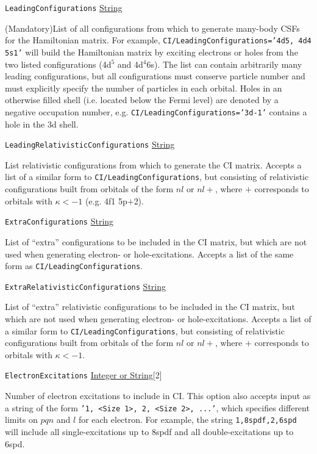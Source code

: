 \documentclass{report}
\begin{document}
\texttt{LeadingConfigurations} \uline{String}
\begin{adjustwidth}{1cm}{}
(Mandatory)List of all configurations from which to generate many-body CSFs for the 
Hamiltonian matrix. For example, \texttt{CI/LeadingConfigurations='4d5, 4d4 5s1'} will build the 
Hamiltonian matrix by exciting electrons or holes from the two listed configurations (4d$^5$ and 
4d$^4$6s). The list can contain arbitrarily many leading configurations, but all configurations must 
conserve particle number and must explicitly specify the number of particles in each orbital. Holes in 
an otherwise filled shell (i.e. located below the Fermi level) are denoted by a negative occupation 
number, e.g. \texttt{CI/LeadingConfigurations='3d-1'} contains a hole in the 3d shell.
\end{adjustwidth}

\texttt{LeadingRelativisticConfigurations} \uline{String}
\begin{adjustwidth}{1cm}{}
List relativistic configurations from which to generate the CI matrix. Accepts a list of a similar form 
to \texttt{CI/LeadingConfigurations}, but consisting of relativistic configurations built from orbitals 
of the form $nl$ or $nl+$, where $+$ corresponds to orbitals with $\kappa < -1$ (e.g. 4f1 5p$+$2).
\end{adjustwidth}


\texttt{ExtraConfigurations} \uline{String}
\begin{adjustwidth}{1cm}{}
List of ``extra'' configurations to be included in the CI matrix, but which are not used when generating
electron- or hole-excitations. Accepts a list of the same form as \texttt{CI/LeadingConfigurations}.
\end{adjustwidth}

\texttt{ExtraRelativisticConfigurations} \uline{String}
\begin{adjustwidth}{1cm}{}
List of ``extra'' relativistic configurations to be included in the CI matrix, but which are not used 
when generating electron- or hole-excitations. Accepts a list of a similar form to
\texttt{CI/LeadingConfigurations}, but consisting of relativistic configurations built from orbitals of
the form $nl$ or $nl+$, where $+$ corresponds to orbitals with $\kappa < -1$.
\end{adjustwidth}

\texttt{ElectronExcitations} \uline{Integer or String}[2]
\begin{adjustwidth}{1cm}{}
Number of electron excitations to include in CI. 
This option also accepts input as a string of the form \texttt{'1, <Size 1>, 2, <Size 2>, ...'},
which specifies different limits on $pqn$ and $l$ for each electron. For example, the string
\texttt{1,8spdf,2,6spd} will include all single-excitations up to 8spdf and all double-excitations up to 
6spd.
\end{adjustwidth}
\end{document}
